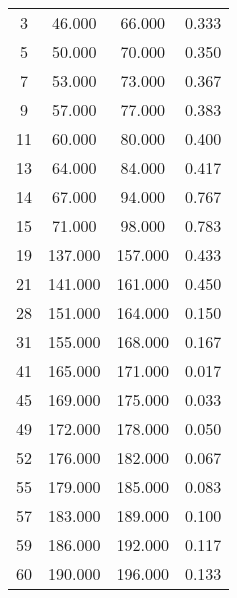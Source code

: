 % 
\begin{tabular}{cccc}
  \hline
  \hline
3 & 46.000 & 66.000 & 0.333 \\ 
  5 & 50.000 & 70.000 & 0.350 \\ 
  7 & 53.000 & 73.000 & 0.367 \\ 
  9 & 57.000 & 77.000 & 0.383 \\ 
  11 & 60.000 & 80.000 & 0.400 \\ 
  13 & 64.000 & 84.000 & 0.417 \\ 
  14 & 67.000 & 94.000 & 0.767 \\ 
  15 & 71.000 & 98.000 & 0.783 \\ 
  19 & 137.000 & 157.000 & 0.433 \\ 
  21 & 141.000 & 161.000 & 0.450 \\ 
  28 & 151.000 & 164.000 & 0.150 \\ 
  31 & 155.000 & 168.000 & 0.167 \\ 
  41 & 165.000 & 171.000 & 0.017 \\ 
  45 & 169.000 & 175.000 & 0.033 \\ 
  49 & 172.000 & 178.000 & 0.050 \\ 
  52 & 176.000 & 182.000 & 0.067 \\ 
  55 & 179.000 & 185.000 & 0.083 \\ 
  57 & 183.000 & 189.000 & 0.100 \\ 
  59 & 186.000 & 192.000 & 0.117 \\ 
  60 & 190.000 & 196.000 & 0.133 \\ 
   \hline
\end{tabular}
